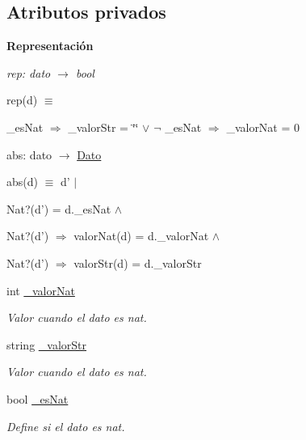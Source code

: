 \subsection*{Atributos privados}
\begin{Indent}{\bf Representación}\par
{\em rep\-: dato $\to$ bool\par
rep(d) $\equiv$
\begin{DoxyItemize}
\item \-\_\-es\-Nat $\Rightarrow$ \-\_\-valor\-Str = \char`\"{}\char`\"{} $\lor$ $\lnot$ \-\_\-es\-Nat $\Rightarrow$ \-\_\-valor\-Nat = 0
\end{DoxyItemize}

abs\-: dato $\to$ \hyperlink{classDato}{Dato}\par
abs(d) $\equiv$ d' $|$
\begin{DoxyItemize}
\item Nat?(d') = d.\-\_\-es\-Nat $\land$
\item Nat?(d') $\Rightarrow$ valor\-Nat(d) = d.\-\_\-valor\-Nat $\land$
\item Nat?(d') $\Rightarrow$ valor\-Str(d) = d.\-\_\-valor\-Str 
\end{DoxyItemize}}\begin{DoxyCompactItemize}
\item 
\hypertarget{classDato_a117b034b0acbfb4b602ab5445855f3f1}{int \hyperlink{classDato_a117b034b0acbfb4b602ab5445855f3f1}{\-\_\-valor\-Nat}}\label{classDato_a117b034b0acbfb4b602ab5445855f3f1}

\begin{DoxyCompactList}\small\item\em Valor cuando el dato es nat. \end{DoxyCompactList}\item 
\hypertarget{classDato_a4abdad075253c04b649282227a01bbed}{string \hyperlink{classDato_a4abdad075253c04b649282227a01bbed}{\-\_\-valor\-Str}}\label{classDato_a4abdad075253c04b649282227a01bbed}

\begin{DoxyCompactList}\small\item\em Valor cuando el dato es nat. \end{DoxyCompactList}\item 
\hypertarget{classDato_a43a0578f47ccb55da86088491f862bf9}{bool \hyperlink{classDato_a43a0578f47ccb55da86088491f862bf9}{\-\_\-es\-Nat}}\label{classDato_a43a0578f47ccb55da86088491f862bf9}

\begin{DoxyCompactList}\small\item\em Define si el dato es nat. \end{DoxyCompactList}\end{DoxyCompactItemize}
\end{Indent}
